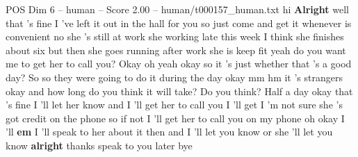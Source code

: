 \begin{textsample}{POS Dim 6 – human – Score 2.00 – human/t000157\_human.txt}  \label{ex:f6_pos_003}
hi \textbf{Alright} well that 's fine I 've left it out in the hall for you so just come and get it whenever is convenient no she 's still at work she working late this week I think she finishes about six but then she goes running after work she is keep fit yeah do you want me to get her to call you?
Okay oh yeah okay so it 's just whether that 's a good day?
So so they were going to do it during the day okay mm hm it 's strangers okay and how long do you think it will take?
Do you think?
Half a day okay that 's fine I 'll let her know and I 'll get her to call you I 'll get I 'm not sure she 's got credit on the phone so if not I 'll get her to call you on my phone oh okay I 'll \textbf{em} I 'll speak to her about it then and I 'll let you know or she 'll let you know \textbf{alright} thanks speak to you later bye

\end{textsample}
